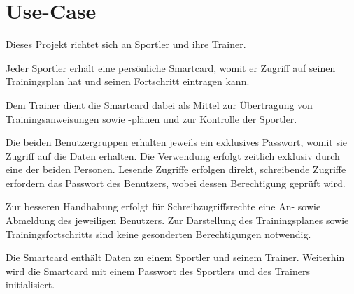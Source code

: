 \documentclass[a4paper,12pt]{article}
\begin{document}
\newpage
{}
\setcounter{page}{1} 



 
\clearpage
 
\onehalfspacing

\setlength{\parindent}{0pt}
\setlength{\parskip}{8pt}
 
 
\newpage
{}
\setcounter{page}{1} 



\section{Use-Case}
Dieses Projekt richtet sich an Sportler und ihre Trainer.

Jeder Sportler erhält eine persönliche Smartcard, womit er Zugriff auf seinen Trainingsplan hat und seinen Fortschritt eintragen kann.

Dem Trainer dient die Smartcard dabei als Mittel zur Übertragung von Trainingsanweisungen sowie -plänen und zur Kontrolle der Sportler.

Die beiden Benutzergruppen erhalten jeweils ein exklusives Passwort, womit sie Zugriff auf die Daten erhalten.
Die Verwendung erfolgt zeitlich exklusiv durch eine der beiden Personen. Lesende Zugriffe erfolgen direkt, schreibende Zugriffe erfordern das Passwort des Benutzers, wobei dessen Berechtigung geprüft wird.

Zur besseren Handhabung erfolgt für Schreibzugriffsrechte eine An- sowie Abmeldung des jeweiligen Benutzers. Zur Darstellung des Trainingsplanes sowie Trainingsfortschritts sind keine gesonderten Berechtigungen notwendig.

Die Smartcard enthält Daten zu einem Sportler und seinem Trainer. Weiterhin wird die Smartcard mit einem Passwort des Sportlers und des Trainers initialisiert.
\end{document}
